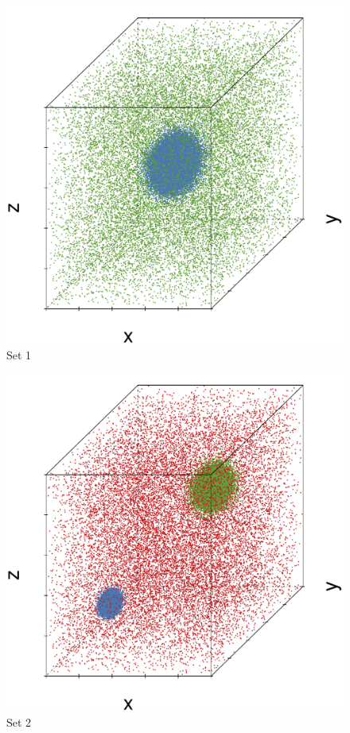 \begin{subfigure}{0.23\textwidth}
	\centering
	\includegraphics[width=\textwidth]{3/img/datasetplot_ferdosi_1_60000.pdf}
	\caption{Set 1}
	\label{fig:3:simulated:datasets:ferdosi1}
\end{subfigure}
\begin{subfigure}{0.23\textwidth}
	\centering
	\includegraphics[width=\textwidth]{3/img/datasetplot_ferdosi_2_60000.pdf}
	\caption{Set 2}
	\label{fig:3:simulated:datasets:ferdosi2}
\end{subfigure}	
